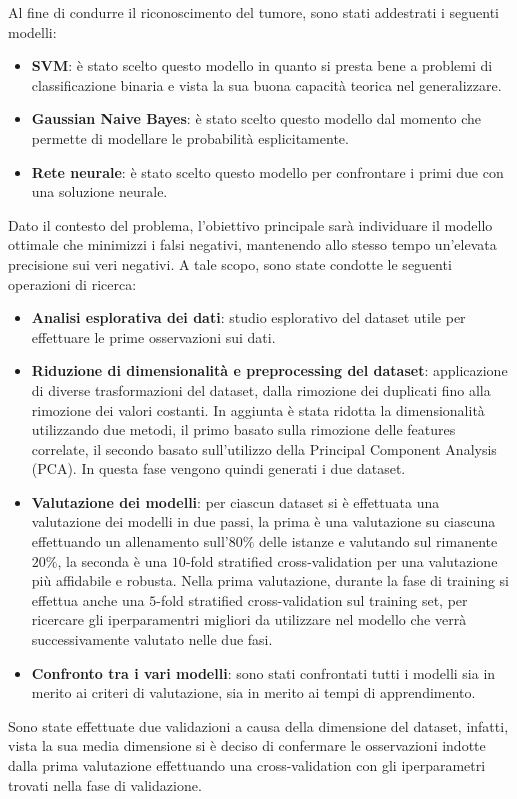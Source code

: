 Al fine di condurre il riconoscimento del tumore, sono stati addestrati i
seguenti modelli:
\begin{itemize}
      \item \textbf{SVM}: è stato scelto questo modello in quanto si presta bene
            a problemi di classificazione binaria e vista la sua buona capacità
            teorica nel generalizzare.
      \item \textbf{Gaussian Naive Bayes}: è stato scelto questo modello dal
            momento che permette di modellare le probabilità esplicitamente.
      \item \textbf{Rete neurale}: è stato scelto questo modello per confrontare
            i primi due con una soluzione neurale.
\end{itemize}
Dato il contesto del problema, l'obiettivo principale sarà individuare il modello
ottimale che minimizzi i falsi negativi, mantenendo allo stesso tempo un'elevata
precisione sui veri negativi. A tale scopo, sono state condotte le seguenti
operazioni di ricerca:
\begin{itemize}
      \item \textbf{Analisi esplorativa dei dati}: studio esplorativo del dataset
            utile per effettuare le prime osservazioni sui dati.
      \item \textbf{Riduzione di dimensionalità e preprocessing del dataset}:
            applicazione di diverse trasformazioni del dataset, dalla rimozione
            dei duplicati fino alla rimozione dei valori costanti. In aggiunta è
            stata ridotta la dimensionalità utilizzando due metodi, il primo
            basato sulla rimozione delle features correlate, il secondo basato
            sull'utilizzo della Principal Component Analysis (PCA). In questa fase
            vengono quindi generati i due dataset.
      \item \textbf{Valutazione dei modelli}: per ciascun dataset si è effettuata
            una valutazione dei modelli in due passi, la prima è una valutazione
            su ciascuna effettuando un allenamento sull'$80\%$ delle istanze e
            valutando sul rimanente $20\%$, la seconda è una $10$-fold stratified
            cross-validation per una valutazione più affidabile e robusta.
            Nella prima valutazione, durante la fase di training si effettua anche
            una $5$-fold stratified cross-validation sul training set, per
            ricercare gli iperparamentri migliori da utilizzare nel modello che
            verrà successivamente valutato nelle due fasi.
      \item \textbf{Confronto tra i vari modelli}: sono stati confrontati tutti
            i modelli sia in merito ai criteri di valutazione, sia in merito ai
            tempi di apprendimento.
\end{itemize}
Sono state effettuate due validazioni a causa della dimensione del dataset,
infatti, vista la sua media dimensione si è deciso di confermare le osservazioni
indotte dalla prima valutazione effettuando una cross-validation con gli
iperparametri trovati nella fase di validazione.

